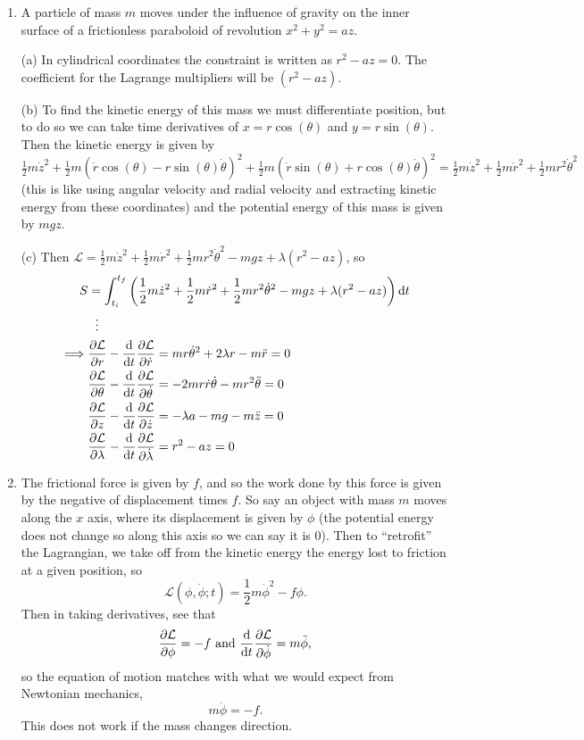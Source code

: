 \documentclass[11pt]{article}
\newcommand{\br}[1]{\left(#1\right)}
\begin{document}
\begin{enumerate}
    \item A particle of mass $m$ moves under the influence of gravity on the inner surface of a frictionless paraboloid of revolution $x^2+y^2 = az$.
    
    (a) In cylindrical coordinates the constraint is written as $r^2 - az = 0$. The coefficient for the Lagrange multipliers will be $(r^2-az)$.

    (b) To find the kinetic energy of this mass we must differentiate position, but to do so we can take time derivatives of $x= r\cos(\theta)$ and $y = r\sin(\theta)$. Then the kinetic energy is given by $\frac{1}{2}m\dot{z}^2 + \frac{1}{2}m(\dot{r}\cos(\theta)-r\sin(\theta)\dot{\theta})^2 + \frac{1}{2}m(\dot{r}\sin(\theta)+ r\cos(\theta)\dot{\theta})^2 = \frac{1}{2}m\dot{z}^2 + \frac{1}{2}m\dot{r}^2 + \frac{1}{2}mr^2\dot{\theta}^2$ (this is like using angular velocity and radial velocity and extracting kinetic energy from these coordinates) and the potential energy of this mass is given by $mgz$. 
    
    (c) Then $\mathcal{L} = \frac{1}{2}m\dot{z}^2 + \frac{1}{2}m\dot{r}^2 + \frac{1}{2}mr^2\dot{\theta}^2 - mgz + \lambda(r^2-az)$, so \begin{align*}
        S &= \int_{t_i}^{t_f}\br{\frac{1}{2}m\dot{z}^2 + \frac{1}{2}m\dot{r}^2 + \frac{1}{2}mr^2\dot{\theta}^2 - mgz + \lambda(r^2-az)}\dd{t} \\
        &\hspace*{6pt}\vdots \\
        \implies& \pdv{\mathcal{L}}{r}-\dv{t}\pdv{\mathcal{L}}{\dot{r}} = mr\dot{\theta}^2 + 2\lambda r -m\ddot{r} = 0\\
        & \pdv{\mathcal{L}}{\theta}-\dv{t}\pdv{\mathcal{L}}{\dot{\theta}} = -2mr\dot{r}\dot{\theta}-mr^2\ddot{\theta} = 0\\
        & \pdv{\mathcal{L}}{z}-\dv{t}\pdv{\mathcal{L}}{\dot{z}} = -\lambda a-mg-m\ddot{z} = 0\\
        & \pdv{\mathcal{L}}{\lambda}-\dv{t}\pdv{\mathcal{L}}{\dot{\lambda}} = r^2-az = 0
    \end{align*} 

    \item The frictional force is given by $f$, and so the work done by this force is given by the negative of displacement times $f$. So say an object with mass $m$ moves along the $x$ axis, where its displacement is given by $\phi$ (the potential energy does not change so along this axis so we can say it is $0$). Then to ``retrofit'' the Lagrangian, we take off from the kinetic energy the energy lost to friction at a given position, so \[\mathcal{L}(\phi,\dot{\phi};t) = \frac{1}{2}m\dot{\phi}^2 - f\phi.\] Then in taking derivatives, see that \[\pdv{\mathcal{L}}{\phi} = -f \text{ and } \dv{t}\pdv{\mathcal{L}}{\dot{\phi}} = m\ddot{\phi},\] so the equation of motion matches with what we would expect from Newtonian mechanics, \[m\ddot{\phi} = -f.\] This does not work if the mass changes direction.
\end{enumerate}
\end{document}
